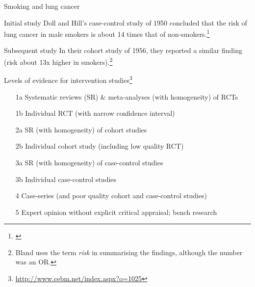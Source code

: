 \documentclass{beamer}
\begin{document}
\begin{frame}{Smoking and lung cancer}
	\begin{block}{Initial study}
Doll and Hill's \alert{case-control study} of 1950 concluded that the risk of lung cancer in male smokers is about 14 times that of non-smokers.\footnote{\tiny{\citet[pp. 241--242]{Bland2000}}}
	\end{block}
	\begin{block}{Subsequent study}
In their \alert{cohort study} of 1956, they reported a similar finding (risk about 13x higher in smokers).\footnote{\tiny{Bland uses the term \emph{risk} in summarising the findings, although the number was an OR.}}
	\end{block}
\end{frame}

\begin{frame}{Levels of evidence for intervention studies\footnote{\tiny{\url{http://www.cebm.net/index.aspx?o=1025}}}}
	\begin{itemize}
	\item[1a] Systematic reviews (SR) \& meta-analyses (with homogeneity) of RCTs
	\item[1b] Individual RCT (with narrow confidence interval)  
	\item[2a] SR (with homogeneity) of cohort studies
	\item[2b] Individual cohort study (including low quality RCT)
	\item[3a] \alert{SR (with homogeneity) of case-control studies}
	\item[3b] \alert{Individual case-control studies}
	\item[4] Case-series (and poor quality cohort and case-control studies)
	\item[5] Expert opinion without explicit critical appraisal; bench research
	\end{itemize}
\end{frame}
\end{document}

